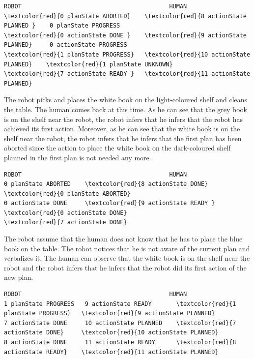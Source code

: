 \documentclass[english,a4paper,11pt,twoside]{StyleThese}
\begin{document}
\begin{scriptsize}
\begin{Verbatim}[commandchars=\\\{\}]              
                      ROBOT                                          HUMAN           
\textcolor{red}{0 planState ABORTED}    \textcolor{red}{8 actionState PLANNED }    0 planState PROGRESS 
\textcolor{red}{0 actionState DONE }    \textcolor{red}{9 actionState PLANNED}     0 actionState PROGRESS 
\textcolor{red}{1 planState PROGRESS}   \textcolor{red}{10 actionState PLANNED}    \textcolor{red}{1 planState UNKNOWN}
\textcolor{red}{7 actionState READY }   \textcolor{red}{11 actionState PLANNED}            
\end{Verbatim}
\end{scriptsize}


The robot picks and places the white book on the light-coloured shelf and cleans the table. The human comes back at this time. As he can see that the grey book is on the shelf near the robot, the robot infers that he infers that the robot has achieved its first action. Moreover, as he can see that the white book is on the shelf near the robot, the robot infers that he infers that the first plan has been aborted since the action to place the white book on the dark-coloured shelf planned in the first plan is not needed any more.

\begin{scriptsize}
\begin{Verbatim}[commandchars=\\\{\}]                                  
                      ROBOT                                          HUMAN                          
0 planState ABORTED    \textcolor{red}{8 actionState DONE}        \textcolor{red}{0 planState ABORTED}
0 actionState DONE     \textcolor{red}{9 actionState READY }      \textcolor{red}{0 actionState DONE}
\textcolor{red}{7 actionState DONE} 
\end{Verbatim}
\end{scriptsize}


The robot assume that the human does not know that he has to place the blue book on the table. The robot notices that he is not aware of the current plan and verbalizes it. The human can observe that the white book is on the shelf near the robot and the robot infers that he infers that the robot did its first action of the new plan.

\begin{scriptsize}
\begin{Verbatim}[commandchars=\\\{\}] 
                      ROBOT                                          HUMAN     
1 planState PROGRESS   9 actionState READY       \textcolor{red}{1 planState PROGRESS}   \textcolor{red}{9 actionState PLANNED}
7 actionState DONE     10 actionState PLANNED    \textcolor{red}{7 actionState DONE}     \textcolor{red}{10 actionState PLANNED}
8 actionState DONE     11 actionState READY      \textcolor{red}{8 actionState READY}    \textcolor{red}{11 actionState PLANNED}
\end{Verbatim}
\end{scriptsize}
\end{document}
